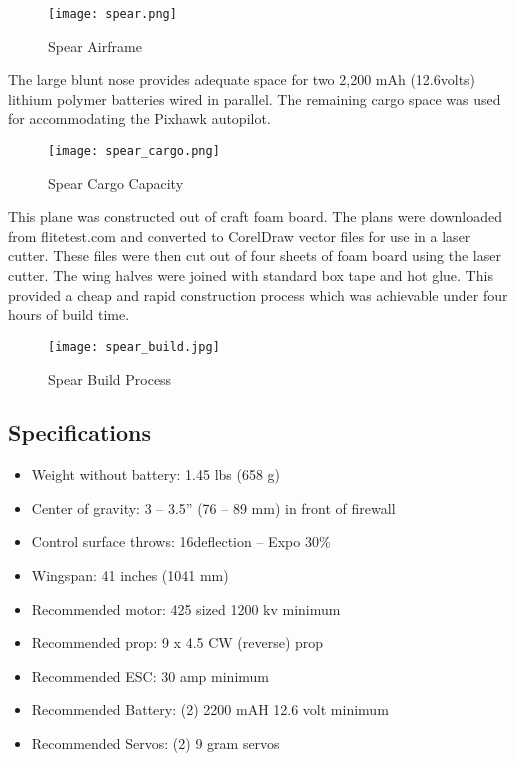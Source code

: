 \begin{figure}[!h]
 \centering
  \texttt{[image: spear.png]}
  \caption{Spear Airframe}
  \label{fig:spear}
\end{figure}

The large blunt nose provides adequate space for two 2,200 mAh (12.6volts) lithium polymer batteries wired in parallel.  The remaining cargo space was used for accommodating the Pixhawk autopilot.

\begin{figure}[!h]
 \centering
  \texttt{[image: spear\_cargo.png]}
  \caption{Spear Cargo Capacity}
  \label{fig:spear_cargo}
\end{figure}

This plane was constructed out of craft foam board.  The plans were downloaded from flitetest.com\cite{flitetest} and converted to CorelDraw vector files for use in a laser cutter.  These files were then cut out of four sheets of foam board using the laser cutter.  The wing halves were joined with standard box tape and hot glue.  This provided a cheap and rapid construction process which was achievable under four hours of build time.

\begin{figure}[!h]
 \centering
  \texttt{[image: spear\_build.jpg]}
  \caption{Spear Build Process}
  \label{fig:spear_build}
\end{figure}

\subsection{Specifications}
\begin{itemize}
 \item Weight without battery: 1.45 lbs (658 g)
 \item Center of gravity: 3 – 3.5” (76 – 89 mm) in front of firewall
 \item Control surface throws: 16\degrees  deflection – Expo 30\%
 \item Wingspan: 41 inches (1041 mm)
 \item Recommended motor: 425 sized 1200 kv minimum
 \item Recommended prop: 9 x 4.5 CW (reverse) prop
 \item Recommended ESC: 30 amp minimum
 \item Recommended Battery: (2) 2200 mAH 12.6 volt minimum
 \item Recommended Servos: (2) 9 gram servos 
\end{itemize}



